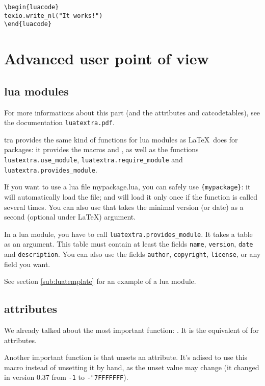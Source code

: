 \documentclass{article}
\begin{document}
\begin{verbatim}
\begin{luacode}
texio.write_nl("It works!")
\end{luacode}
\end{verbatim}

\section{Advanced user point of view}

\subsection{lua modules}

For more informations about this part (and the attributes and catcodetables), see the documentation \texttt{luatextra.pdf}.

\LuaTeX tra provides the same kind of functions for lua modules as \LaTeX\ does for packages: it provides the macros \texttt{\string\luaUseModule} and \texttt{\string\luaRequireModule}, as well as the functions \texttt{luatextra.use\_module}, \texttt{luatextra.require\_module} and \texttt{luatextra.provides\_module}.

If you want to use a lua file mypackage.lua, you can safely use \texttt{\string\luaUseModule\{mypackage\}}: it will automatically load the file; and will load it only once if the function is called several times. You can also use \texttt{\string\luaRequireModule} that takes the minimal version (or date) as a second (optional under \LaTeX ) argument.

In a lua module, you have to call \texttt{luatextra.provides\_module}. It takes a table as an argument. This table must contain at least the fields \texttt{name}, \texttt{version}, \texttt{date} and \texttt{description}. You can also use the fields \texttt{author}, \texttt{copyright}, \texttt{license}, or any field you want.

See section \ref{sub:luatemplate} for an example of a lua module.

\subsection{attributes}

We already talked about the most important function: \texttt{\string\newluaattribute}. It is the equivalent of \texttt{\string\newcount} for attributes.

Another important function is \texttt{\string\unsetluaattribute} that unsets an attribute. It's adised to use this macro instead of unsetting it by hand, as the unset value may change (it changed in version 0.37 from \texttt{-1} to \texttt{-"7FFFFFFF}).
\end{document}
